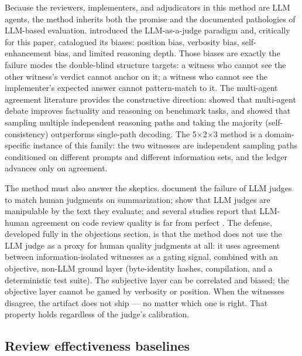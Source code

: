 \documentclass[11pt]{article}
\theoremstyle{definition}
\theoremstyle{plain}
\theoremstyle{remark}
\begin{document}
Because the reviewers, implementers, and adjudicators in this method are LLM
agents, the method inherits both the promise and the documented pathologies
of LLM-based evaluation. \citet{zheng2023judging} introduced the
LLM-as-a-judge paradigm and, critically for this paper, catalogued its
biases: position bias, verbosity bias, self-enhancement bias, and limited
reasoning depth. Those biases are exactly the failure modes the double-blind
structure targets: a witness who cannot see the other witness's verdict
cannot anchor on it; a witness who cannot see the implementer's expected
answer cannot pattern-match to it. The multi-agent agreement literature
provides the constructive direction: \citet{du2023} showed that multi-agent
debate improves factuality and reasoning on benchmark tasks, and
\citet{wang2022} showed that sampling multiple independent reasoning paths
and taking the majority (self-consistency) outperforms single-path decoding.
The 5$\times$2$\times$3 method is a domain-specific instance of this family:
the two witnesses are independent sampling paths conditioned on different
prompts and different information sets, and the ledger advances only on
agreement.

The method must also answer the skeptics. \citet{liu2023} document the
failure of LLM judges to match human judgments on summarization;
\citet{chan2023chateval} show that LLM judges are manipulable by the text
they evaluate; and several studies report that LLM-human agreement on code
review quality is far from perfect \citep{lu2023,khomh2012}. The defense,
developed fully in the objections section, is that the method does not use
the LLM judge as a proxy for human quality judgments at all: it uses
agreement between information-isolated witnesses as a gating signal,
combined with an objective, non-LLM ground layer (byte-identity hashes,
compilation, and a deterministic test suite). The subjective layer can be
correlated and biased; the objective layer cannot be gamed by verbosity or
position. When the witnesses disagree, the artifact does not ship --- no
matter which one is right. That property holds regardless of the judge's
calibration.

\subsection{Review effectiveness baselines}
\end{document}
